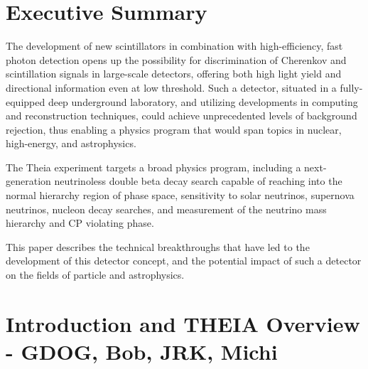 \section*{Executive Summary}

The  development of new scintillators in combination with high-efficiency, fast photon detection opens up the possibility for discrimination of Cherenkov and scintillation signals in large-scale detectors, offering both high light yield and directional information even at low threshold.  Such a detector, situated in a fully-equipped deep underground laboratory, and utilizing developments in computing and reconstruction techniques, could achieve unprecedented levels of background rejection, thus enabling a physics program that would span topics in nuclear, high-energy, and astrophysics.  

The Theia experiment targets a broad physics program, including a next-generation neutrinoless double beta decay search capable of reaching into the normal hierarchy region of phase space, sensitivity to solar neutrinos, supernova neutrinos, nucleon decay searches, and measurement of the neutrino mass hierarchy and CP violating phase.  

This paper describes the technical breakthroughs that have led to the development of this detector concept, and the potential impact of such a detector on the fields of particle and astrophysics. 

\newpage

\tableofcontents
\setcounter{tocdepth}{5}
\newpage

\section{Introduction and THEIA Overview - GDOG, Bob, JRK, Michi}

